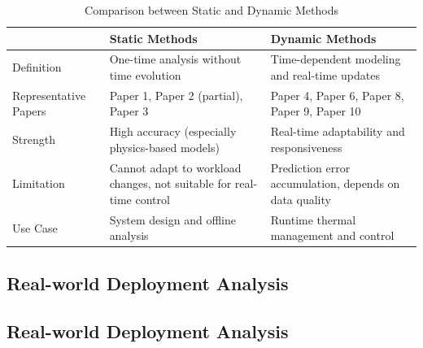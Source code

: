 \documentclass[12pt,a4paper]{article}
\begin{document}
            \begin{table}[H]
            \centering
            
            \caption{Comparison between Static and Dynamic Methods}
            \label{tab:static_dynamic}
            \begin{tabular}{p{3cm} p{5cm} p{5cm}}
            \toprule
             & Static Methods & Dynamic Methods \\
            \midrule
            Definition & One-time analysis without time evolution & Time-dependent modeling and real-time updates \\
            
            Representative Papers & Paper 1, Paper 2 (partial), Paper 3 & Paper 4, Paper 6, Paper 8, Paper 9, Paper 10 \\
            
            Strength & High accuracy (especially physics-based models) & Real-time adaptability and responsiveness \\
            
            Limitation & Cannot adapt to workload changes, not suitable for real-time control & Prediction error accumulation, depends on data quality \\
            
            Use Case & System design and offline analysis & Runtime thermal management and control \\
            \bottomrule
            \end{tabular}
            \end{table}
            
    \subsection{Real-world Deployment Analysis}
                \subsection{Real-world Deployment Analysis}
\end{document}
